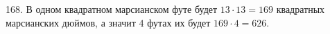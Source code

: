 168. В одном квадратном марсианском футе будет $13\cdot13=169$ квадратных марсианских дюймов, а значит 4 футах их будет $169\cdot4=626.$\\
